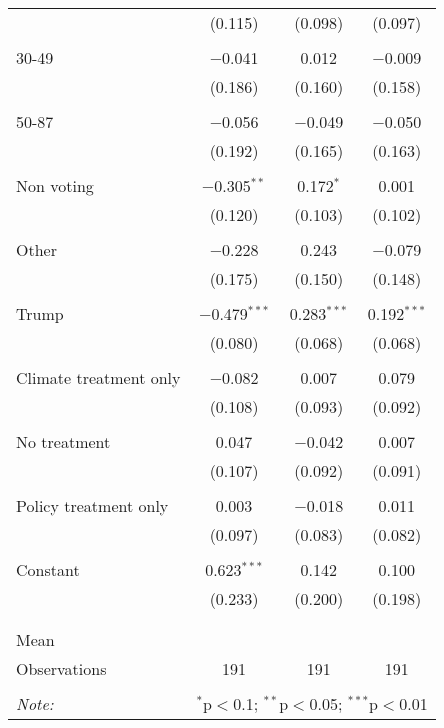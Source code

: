 \begin{tabular}{@{\extracolsep{5pt}}lccc}
  & (0.115) & (0.098) & (0.097) \\ 
  & & & \\ 
 30-49 & $-$0.041 & 0.012 & $-$0.009 \\ 
  & (0.186) & (0.160) & (0.158) \\ 
  & & & \\ 
 50-87 & $-$0.056 & $-$0.049 & $-$0.050 \\ 
  & (0.192) & (0.165) & (0.163) \\ 
  & & & \\ 
 Non voting & $-$0.305$^{**}$ & 0.172$^{*}$ & 0.001 \\ 
  & (0.120) & (0.103) & (0.102) \\ 
  & & & \\ 
 Other & $-$0.228 & 0.243 & $-$0.079 \\ 
  & (0.175) & (0.150) & (0.148) \\ 
  & & & \\ 
 Trump & $-$0.479$^{***}$ & 0.283$^{***}$ & 0.192$^{***}$ \\ 
  & (0.080) & (0.068) & (0.068) \\ 
  & & & \\ 
 Climate treatment only & $-$0.082 & 0.007 & 0.079 \\ 
  & (0.108) & (0.093) & (0.092) \\ 
  & & & \\ 
 No treatment & 0.047 & $-$0.042 & 0.007 \\ 
  & (0.107) & (0.092) & (0.091) \\ 
  & & & \\ 
 Policy treatment only & 0.003 & $-$0.018 & 0.011 \\ 
  & (0.097) & (0.083) & (0.082) \\ 
  & & & \\ 
 Constant & 0.623$^{***}$ & 0.142 & 0.100 \\ 
  & (0.233) & (0.200) & (0.198) \\ 
  & & & \\ 
\hline \\[-1.8ex] 
Mean &  &  &  \\ 
Observations & 191 & 191 & 191 \\ 
\hline 
\hline \\[-1.8ex] 
\textit{Note:}  & \multicolumn{3}{r}{$^{*}$p$<$0.1; $^{**}$p$<$0.05; $^{***}$p$<$0.01} \\ 
\end{tabular} 
